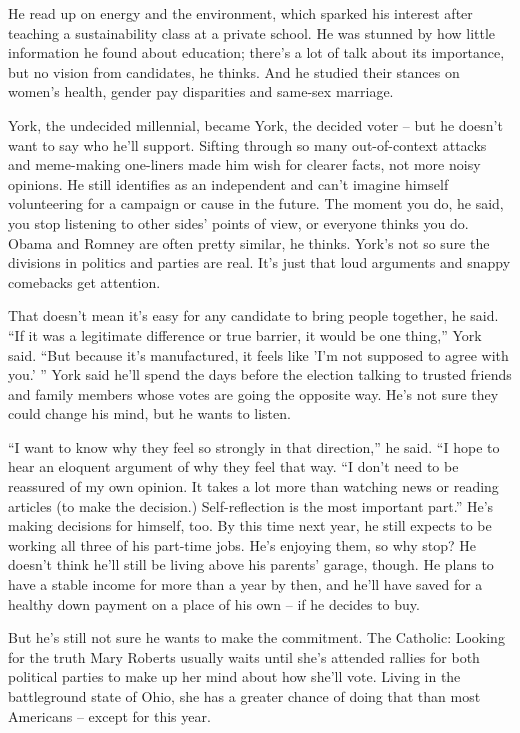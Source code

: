 \documentclass[%
        TwoSidePages,%
        English,%
        FinalVersion,%
        Copyright,%
        TablesPage,%
        FiguresPage,%
        ]%
{ic-tese-v2}
\begin{document}
He read up on energy and the environment, which sparked his interest after teaching a sustainability class at a private school. He was stunned by how little information he found about education; there's a lot of talk about its importance, but no vision from candidates, he thinks. And he studied their stances on women's health, gender pay disparities and same-sex marriage.

York, the undecided millennial, became York, the decided voter -- but he doesn't want to say who he'll support. Sifting through so many out-of-context attacks and meme-making one-liners made him wish for clearer facts, not more noisy opinions.
He still identifies as an independent and can't imagine himself volunteering for a campaign or cause in the future. The moment you do, he said, you stop listening to other sides' points of view, or everyone thinks you do. Obama and Romney are often pretty similar, he thinks. York's not so sure the divisions in politics and parties are real. It's just that loud arguments and snappy comebacks get attention.

That doesn't mean it's easy for any candidate to bring people together, he said.
``If it was a legitimate difference or true barrier, it would be one thing,'' York said. ``But because it's manufactured, it feels like 'I'm not supposed to agree with you.' ''
York said he'll spend the days before the election talking to trusted friends and family members whose votes are going the opposite way. He's not sure they could change his mind, but he wants to listen.

``I want to know why they feel so strongly in that direction,'' he said. ``I hope to hear an eloquent argument of why they feel that way.
``I don't need to be reassured of my own opinion. It takes a lot more than watching news or reading articles (to make the decision.) Self-reflection is the most important part.''
He's making decisions for himself, too. By this time next year, he still expects to be working all three of his part-time jobs. He's enjoying them, so why stop? He doesn't think he'll still be living above his parents' garage, though. He plans to have a stable income for more than a year by then, and he'll have saved for a healthy down payment on a place of his own -- if he decides to buy.

But he's still not sure he wants to make the commitment.
The Catholic: Looking for the truth
Mary Roberts usually waits until she's attended rallies for both political parties to make up her mind about how she'll vote. Living in the battleground state of Ohio, she has a greater chance of doing that than most Americans -- except for this year.
\end{document}
